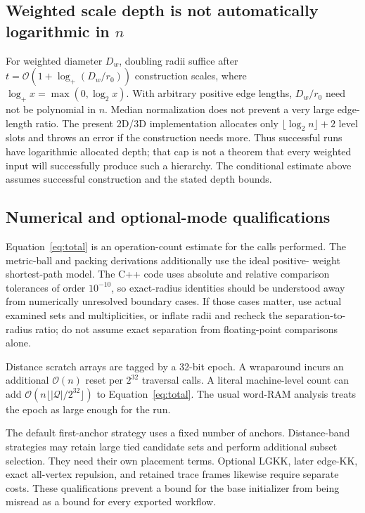 \documentclass[11pt,a4paper]{article}
\newcommand{\bigO}{\mathcal O}
\begin{document}
\subsection{Weighted scale depth is not automatically logarithmic in \texorpdfstring{$n$}{n}}

For weighted diameter $D_w$, doubling radii suffice after
$t=\bigO(1+\log_+(D_w/r_0))$ construction scales, where
$\log_+x=\max(0,\log_2x)$. With arbitrary positive edge lengths, $D_w/r_0$
need not be polynomial in $n$. Median normalization does not prevent a very
large edge-length ratio. The present 2D/3D implementation allocates only
$\lfloor\log_2n\rfloor+2$ level slots and throws an error if the construction
needs more. Thus successful runs have logarithmic allocated depth; that cap is
not a theorem that every weighted input will successfully produce such a
hierarchy. The conditional estimate above assumes successful construction and
the stated depth bounds.

\subsection{Numerical and optional-mode qualifications}

Equation~\eqref{eq:total} is an operation-count estimate for the calls performed.
The metric-ball and packing derivations additionally use the ideal positive-
weight shortest-path model. The C++ code uses absolute and relative comparison
tolerances of order $10^{-10}$, so exact-radius identities should be understood
away from numerically unresolved boundary cases. If those cases matter, use
actual examined sets and multiplicities, or inflate radii and recheck the
separation-to-radius ratio; do not assume exact separation from floating-point
comparisons alone.

Distance scratch arrays are tagged by a 32-bit epoch. A wraparound incurs
an additional $\bigO(n)$ reset per $2^{32}$ traversal calls. A literal
machine-level count can add $\bigO(n\lfloor|\mathcal Q|/2^{32}\rfloor)$ to
Equation~\eqref{eq:total}. The usual word-RAM analysis treats the epoch as large
enough for the run.

The default first-anchor strategy uses a fixed number of anchors. Distance-band
strategies may retain large tied candidate sets and perform additional subset
selection. They need their own placement terms. Optional LGKK, later edge-KK,
exact all-vertex repulsion, and retained trace frames likewise require separate
costs. These qualifications prevent a bound for the base initializer from being
misread as a bound for every exported workflow.
\end{document}
